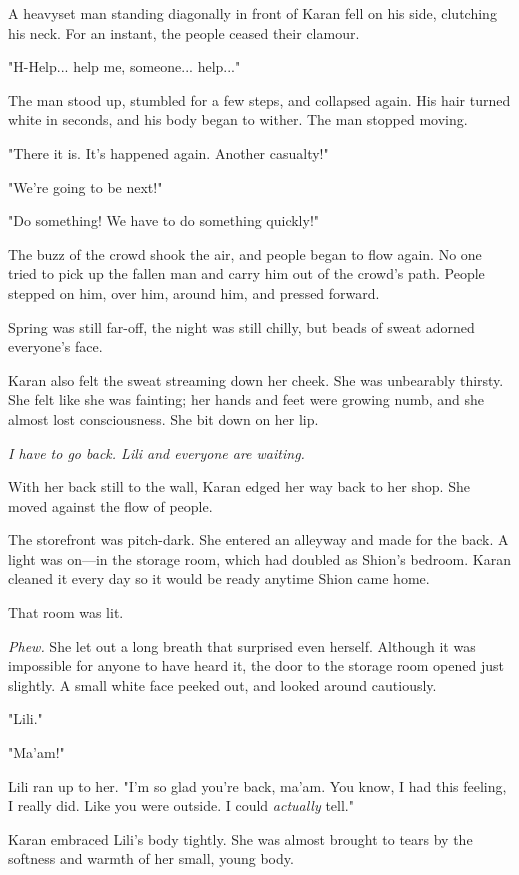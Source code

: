 A heavyset man standing diagonally in front of Karan fell on his side,
clutching his neck. For an instant, the people ceased their clamour.

"H-Help... help me, someone... help..."

The man stood up, stumbled for a few steps, and collapsed again. His
hair turned white in seconds, and his body began to wither. The man
stopped moving.

"There it is. It's happened again. Another casualty!"

"We're going to be next!"

"Do something! We have to do something quickly!"

The buzz of the crowd shook the air, and people began to flow again. No
one tried to pick up the fallen man and carry him out of the crowd's
path. People stepped on him, over him, around him, and pressed forward.

Spring was still far-off, the night was still chilly, but beads of sweat
adorned everyone's face.

Karan also felt the sweat streaming down her cheek. She was unbearably
thirsty. She felt like she was fainting; her hands and feet were growing
numb, and she almost lost consciousness. She bit down on her lip.

\emph{I have to go back. Lili and everyone are waiting.}

With her back still to the wall, Karan edged her way back to her shop.
She moved against the flow of people.

The storefront was pitch-dark. She entered an alleyway and made for the
back. A light was on---in the storage room, which had doubled as Shion's
bedroom. Karan cleaned it every day so it would be ready anytime Shion
came home.

That room was lit.

\emph{Phew.} She let out a long breath that surprised even herself. Although it
was impossible for anyone to have heard it, the door to the storage room
opened just slightly. A small white face peeked out, and looked around
cautiously.

"Lili."

"Ma'am!"

Lili ran up to her. "I'm so glad you're back, ma'am. You know, I had
this feeling, I really did. Like you were outside. I could \emph{actually}
tell."

Karan embraced Lili's body tightly. She was almost brought to tears by
the softness and warmth of her small, young body.

